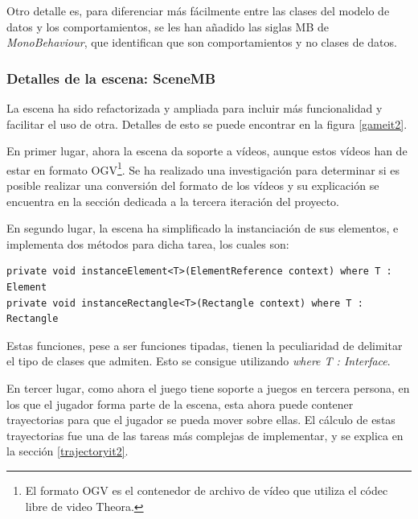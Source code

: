 Otro detalle es, para diferenciar más fácilmente entre las clases del modelo de datos y los comportamientos, se les han añadido las siglas MB de \textit{MonoBehaviour}, que identifican que son comportamientos y no clases de datos.

\subsubsection{Detalles de la escena: SceneMB}
\label{scene}

La escena ha sido refactorizada y ampliada para incluir más funcionalidad y facilitar el uso de otra. Detalles de esto se puede encontrar en la figura \ref{gameit2}.

En primer lugar, ahora la escena da soporte a vídeos, aunque estos vídeos han de estar en formato OGV\footnote{El formato OGV es el contenedor de archivo de vídeo que utiliza el códec libre de video Theora.}. Se ha realizado una investigación para determinar si es posible realizar una conversión del formato de los vídeos y su explicación se encuentra en la sección dedicada a la tercera iteración del proyecto.

En segundo lugar, la escena ha simplificado la instanciación de sus elementos, e implementa dos métodos para dicha tarea, los cuales son:

\begin{lstlisting}
private void instanceElement<T>(ElementReference context) where T : Element
private void instanceRectangle<T>(Rectangle context) where T : Rectangle
\end{lstlisting}

Estas funciones, pese a ser funciones tipadas, tienen la peculiaridad de delimitar el tipo de clases que admiten. Esto se consigue utilizando \textit{where T : Interface}.

En tercer lugar, como ahora el juego tiene soporte a juegos en tercera persona, en los que el jugador forma parte de la escena, esta ahora puede contener trayectorias para que el jugador se pueda mover sobre ellas. El cálculo de estas trayectorias fue una de las tareas más complejas de implementar, y se explica en la sección \ref{trajectoryit2}.

